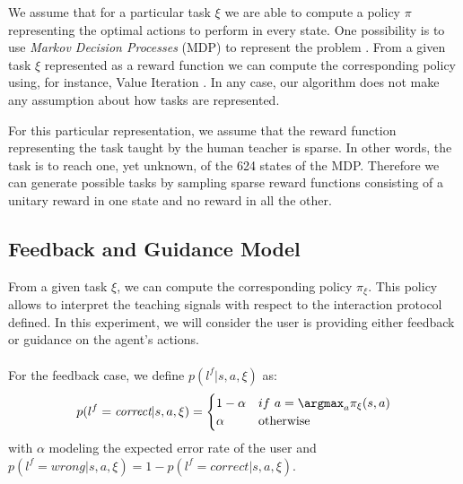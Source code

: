 We assume that for a particular task $\xi$ we are able to compute a policy $\pi$ representing the optimal actions to perform in every state. One possibility is to use \textit{Markov Decision Processes} (MDP) to represent the problem \cite{sutton1998reinforcement}. From a given task $\xi$ represented as a reward function we can compute the corresponding policy using, for instance, Value Iteration \cite{sutton1998reinforcement}. In any case, our algorithm does not make any assumption about how tasks are represented.

For this particular representation, we assume that the reward function representing the task taught by the human teacher is sparse. In other words, the task is to reach one, yet unknown, of the 624 states of the MDP. Therefore we can generate possible tasks by sampling sparse reward functions consisting of a unitary reward in one state and no reward in all the other.

\subsection{Feedback and Guidance Model}
\label{chapter:lfui:framemodels}

From a given task $\xi$, we can compute the corresponding policy $\pi_{\xi}$. This policy allows to interpret the teaching signals with respect to the interaction protocol defined. In this experiment, we will consider the user is providing either feedback or guidance on the agent's actions. 

\paragraph{} For the feedback case, we define $p(l^f |s,a,\xi)$ as:
%
\begin{equation}
    p(l^f = \emph{correct} |s,a,\xi) = 
    \begin{cases}
    1-\alpha               & if~a = \argmax_a \pi_{\xi}(s,a)\\
        \alpha             & \text{otherwise}\\
   \end{cases}
   \label{eq:feedbackframe}
\end{equation}
%
with $\alpha$ modeling the expected error rate of the user and $p(l^f = wrong |s,a,\xi) = 1 - p(l^f = correct |s,a,\xi)$.

